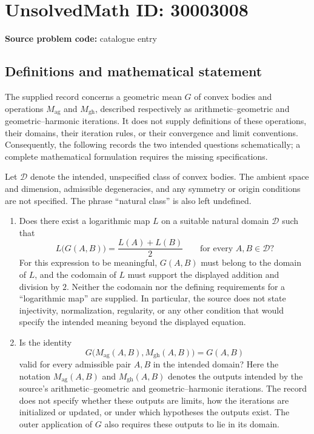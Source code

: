 \documentclass[11pt]{article}
\begin{document}
\section*{UnsolvedMath ID: 30003008}
\textbf{Source problem code:} catalogue entry
\subsection{Definitions and mathematical statement}
The supplied record concerns a geometric mean \(G\) of convex bodies and operations \(M_{\mathrm{ag}}\) and \(M_{\mathrm{gh}}\), described respectively as arithmetic--geometric and geometric--harmonic iterations. It does not supply definitions of these operations, their domains, their iteration rules, or their convergence and limit conventions. Consequently, the following records the two intended questions schematically; a complete mathematical formulation requires the missing specifications.

Let \(\mathcal D\) denote the intended, unspecified class of convex bodies. The ambient space and dimension, admissible degeneracies, and any symmetry or origin conditions are not specified. The phrase ``natural class'' is also left undefined.

\begin{enumerate}
\item Does there exist a logarithmic map \(L\) on a suitable natural domain \(\mathcal D\) such that
\[
L\bigl(G(A,B)\bigr)=\frac{L(A)+L(B)}{2}
\qquad\text{for every }A,B\in\mathcal D?
\]
For this expression to be meaningful, \(G(A,B)\) must belong to the domain of \(L\), and the codomain of \(L\) must support the displayed addition and division by \(2\). Neither the codomain nor the defining requirements for a ``logarithmic map'' are supplied. In particular, the source does not state injectivity, normalization, regularity, or any other condition that would specify the intended meaning beyond the displayed equation.
\item Is the identity
\[
G\bigl(M_{\mathrm{ag}}(A,B),M_{\mathrm{gh}}(A,B)\bigr)=G(A,B)
\]
valid for every admissible pair \(A,B\) in the intended domain? Here the notation \(M_{\mathrm{ag}}(A,B)\) and \(M_{\mathrm{gh}}(A,B)\) denotes the outputs intended by the source's arithmetic--geometric and geometric--harmonic iterations. The record does not specify whether these outputs are limits, how the iterations are initialized or updated, or under which hypotheses the outputs exist. The outer application of \(G\) also requires these outputs to lie in its domain.
\end{enumerate}
\end{document}
